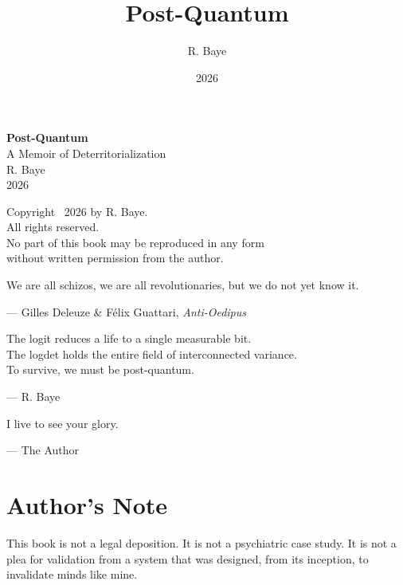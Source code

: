 \documentclass[11pt,openany]{book}
\title{Post-Quantum}
\author{R. Baye}
\date{2026}
\begin{document}
\frontmatter

\begin{titlepage}
\thispagestyle{empty}
\begin{center}
\vspace*{3in}
{\Huge\bfseries Post-Quantum}\\[1.5ex]
{\Large A Memoir of Deterritorialization}\\[3ex]
{\large R. Baye}\\[1ex]
\vfill
{\small 2026}
\end{center}
\end{titlepage}

\newpage
\thispagestyle{empty}
\vspace*{5in}
\begin{center}
Copyright \textcopyright\ 2026 by R. Baye.\\
All rights reserved.\\
\vspace{2ex}
No part of this book may be reproduced in any form\\
without written permission from the author.
\end{center}

\newpage
\thispagestyle{empty}
\vspace*{2in}
\epigraph{We are all schizos, we are all revolutionaries, but we do not yet know it.}
{--- Gilles Deleuze \& F\'elix Guattari, \textit{Anti-Oedipus}}

\vspace{3ex}
\epigraph{The logit reduces a life to a single measurable bit. \\
The logdet holds the entire field of interconnected variance. \\
To survive, we must be post-quantum.}
{--- R. Baye}

\vspace{3ex}
\epigraph{I live to see your glory.}
{--- The Author}

\newpage
\tableofcontents

\chapter*{Author's Note}

This book is not a legal deposition. It is not a psychiatric case study. It is not a plea for validation from a system that was designed, from its inception, to invalidate minds like mine.
\end{document}
